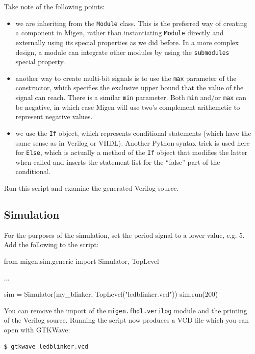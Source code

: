 \documentclass[11pt]{paper}
\begin{document}
Take note of the following points:
\begin{itemize}
\item we are inheriting from the \verb!Module! class. This is the preferred way of creating a component in Migen, rather than instantiating \verb!Module! directly and externally using its special properties as we did before. In a more complex design, a module can integrate other modules by using the \verb!submodules! special property.
\item another way to create multi-bit signals is to use the \verb!max! parameter of the constructor, which specifies the exclusive upper bound that the value of the signal can reach. There is a similar \verb!min! parameter. Both \verb!min! and/or \verb!max! can be negative, in which case Migen will use two's complement arithemetic to represent negative values.
\item we use the \verb!If! object, which represents conditional statements (which have the same sense as in Verilog or VHDL). Another Python syntax trick is used here for \verb!Else!, which is actually a method of the \verb!If! object that modifies the latter when called and inserts the statement list for the ``false'' part of the conditional.
\end{itemize}

Run this script and examine the generated Verilog source.


\subsection{Simulation}
For the purposes of the simulation, set the period signal to a lower value, e.g. 5. Add the following to the script:
\begin{verbatimtab}
from migen.sim.generic import Simulator, TopLevel

...

sim = Simulator(my_blinker, TopLevel("ledblinker.vcd"))
sim.run(200)
\end{verbatimtab}

You can remove the import of the \verb!migen.fhdl.verilog! module and the printing of the Verilog source. Running the script now produces a VCD file which you can open with GTKWave:
\begin{verbatim}
$ gtkwave ledblinker.vcd
\end{verbatim}
\end{document}
